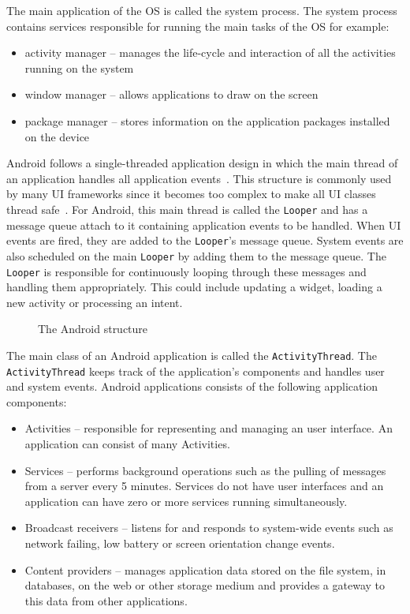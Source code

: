 \documentclass{acm_proc_article-sp}
\begin{document}
The main application of the OS is called the system process. The system process
contains services responsible for running the main tasks of the OS for example:
\begin{itemize}
 \item activity manager -- manages the life-cycle and interaction of all the activities running on the system
 \item window manager -- allows applications to draw on the screen
 \item package manager -- stores information on the application packages installed on the device
\end{itemize}

Android follows a single-threaded application design in which the main thread of an application handles all application events~\cite{AndroidDocs}. This structure is
commonly used by many UI frameworks since it becomes too complex to make all UI classes thread safe~\cite{SingleThread}. For Android, this main thread is called
the \texttt{Looper} and has a message queue attach to it containing application events to be handled. When UI events are fired, they
are added to the \texttt{Looper}'s message queue. System events are also scheduled on the main \texttt{Looper} by adding them to the message
queue. The \texttt{Looper} is responsible for continuously looping through these messages and handling them appropriately. This could
include updating a widget, loading a new activity or processing an intent.

\begin{figure}
\centering
{}
\caption{The Android structure}
\end{figure}

The main class of an Android application is called the \texttt{ActivityThread}. The \texttt{ActivityThread} keeps track of the
application's components and handles user and system events. Android applications consists of the
following application components:
\begin{itemize}
\item Activities -- responsible for representing and managing an user interface. An application can consist of many
Activities.
\item Services -- performs background operations such as the pulling of messages from a server every 5 minutes. Services do not have user
interfaces and an application can have zero or more services running simultaneously.
\item Broadcast receivers -- listens for and responds to system-wide events such as network failing, low battery or screen orientation
change events.
\item Content providers -- manages application data stored on the file system, in databases, on the web or other storage medium and provides
a gateway to this data from other applications.
\end{itemize}
\end{document}

